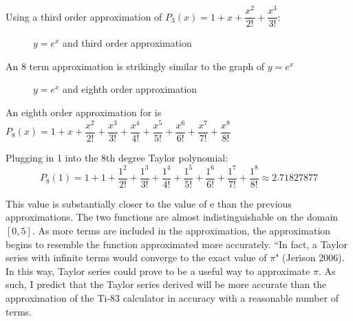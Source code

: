 \documentclass[12pt, titlepage]{article}
\begin{document}
Using a third order approximation of \(P_{3}(x) = 1 + x + \dfrac{x^{2}}{2!} + \dfrac{x^{3}}{3!}\):
\begin{figure}[H]
\centering
    \caption[]{\(y=e^x\) and third order approximation}
\end{figure}

An 8 term approximation is strikingly similar to the graph of \(y = e^{x}\)
\begin{figure}[H]
\centering
    \caption[]{\(y=e^x\) and eighth order approximation}
\end{figure}

An eighth order approximation for is \(P_{8}(x) = 1 + x + \dfrac{x^2}{2!} + \dfrac{x^3}{3!} + \dfrac{x^4}{4!} + \dfrac{x^5}{5!} + \dfrac{x^6}{6!} + \dfrac{x^7}{7!} + \dfrac{x^8}{8!}\)

Plugging in 1 into the 8th degree Taylor polynomial:
\begin{equation*}
	P_{8}(1) = 1 + 1 + \dfrac{1^2}{2!} + \dfrac{1^3}{3!} + \dfrac{1^4}{4!} + \dfrac{1^5}{5!} + \dfrac{1^6}{6!} + \dfrac{1^7}{7!} + \dfrac{1^8}{8!} \approx 2.71827877
\end{equation*}

This value is substantially closer to the value of e than the previous approximations. The two functions are almost indistinguishable on the domain \([0,5]\). As more terms are included in the approximation, the approximation begins to resemble the function approximated more accurately. ``In fact, a Taylor series with infinite terms would converge to the exact value of \(\pi\)" (Jerison 2006). In this way, Taylor series could prove to be a useful way to approximate \(\pi\). As such, I predict that the Taylor series derived will be more accurate than the approximation of the Ti-83 calculator in accuracy with a reasonable number of terms.
\end{document}
